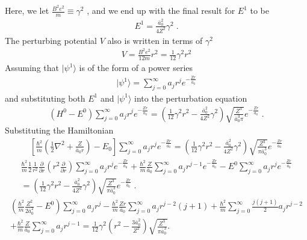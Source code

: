     \noindent Here, we let $\frac{B^2 e^2}{m} \equiv \gamma^2$ \cite{Killingbeck_1979}, and we end up with the final result for $E^1$ to be 
    \begin{align}
        E^1 = \frac{\bar{a}_0^2}{4Z^2} \gamma^2\;.
    \end{align}
    \noindent The perturbing potential $V$ also is written in terms of $\gamma^2$
    \begin{align}
        V = \frac{B^2 e^2}{12m} r^2 = \frac{1}{12} \gamma^2 r^2
    \end{align}
    \noindent Assuming that $\vert \psi^1 \rangle$ is of the form of a power series 
    \begin{align}
        \vert \psi^1 \rangle = \sum_{j = 0}^\infty a_j r^j e^{-\frac{Zr}{\bar{a}_0}}
    \end{align}
    \noindent and substituting both $E^1$ and $\vert \psi^1 \rangle$ into the perturbation equation
    \begin{align}
        \left(H^0 - E^0 \right) \sum_{j = 0}^\infty  a_j r^j e^{-\frac{Zr}{\bar{a}_0}} = \left( \frac{1}{12} \gamma^2 r^2 - \frac{\bar{a}_0^2}{4Z^2} \gamma^2 \right) \sqrt{\frac{Z^3}{\bar{a}_0^3 \pi}} e^{-\frac{Zr}{\bar{a}_0}}\;.
    \end{align}
    \noindent Substituting the Hamiltonian 
    \begin{align*}
        \left[ \frac{\hbar^2}{m} \left(\frac{1}{2}\nabla^2 + \frac{Z}{\bar{a}_0 r}\right) - E_0\right] \sum_{j = 0}^\infty a_j r^j e^{-\frac{Zr}{\bar{a_0}}} = \left( \frac{1}{12} \gamma^2 r^2 - \frac{\bar{a}_0^2}{4Z^2} \gamma^2 \right) \sqrt{\frac{Z^3}{\pi \bar{a}_0^3}} e^{-\frac{Zr}{\bar{a}_0}}
    \end{align*}
    \begin{align*}
        \frac{\hbar^2}{m}\frac{1}{2} \frac{1}{r^2} \frac{\partial}{\partial r} \left(r^2 \frac{\partial}{\partial r} \right) \sum_{j = 0}^\infty a_j r^j e^{-\frac{Zr}{\bar{a}_0}} + \frac{\hbar^2}{m}\frac{Z}{\bar{a}_0} \sum_{j = 0}^\infty a_j r^{j - 1} e^{-\frac{Zr}{\bar{a}_0}} - E^0 \sum_{j = 0}^\infty a_j r^j e^{-\frac{Zr}{\bar{a}_0}} \nonumber\\ = \left( \frac{1}{12} \gamma^2 r^2 - \frac{\bar{a}_0^2}{4Z^2} \gamma^2 \right) \sqrt{\frac{Z^3}{\pi \bar{a}_0^3}} e^{-\frac{Zr}{\bar{a}_0}}\;.
    \end{align*}
    \begin{align*}
        \left( \frac{\hbar^2}{m}\frac{Z^2}{2 \bar{a}_0^2} - E^0\right) \sum_{j = 0}^\infty a_j r^j - \frac{\hbar^2}{m}\frac{Zr}{\bar{a}_0} \sum_{j = 0}^\infty a_j r^{j -2} (j + 1) + \frac{\hbar^2}{m}\sum_{j = 0}^\infty \frac{j(j+1)}{2} a_j r^{j - 2} \nonumber\\+ \frac{\hbar^2}{m}\frac{Z}{\bar{a}_0} \sum_{j = 0}^\infty a_j r^{j -1} = \frac{1}{12} \gamma^2 \left(r^2 - \frac{3 \bar{a}_0^2}{Z^2} \right) \sqrt{\frac{Z^3}{\pi \bar{a}_0^3}}.
    \end{align*}
